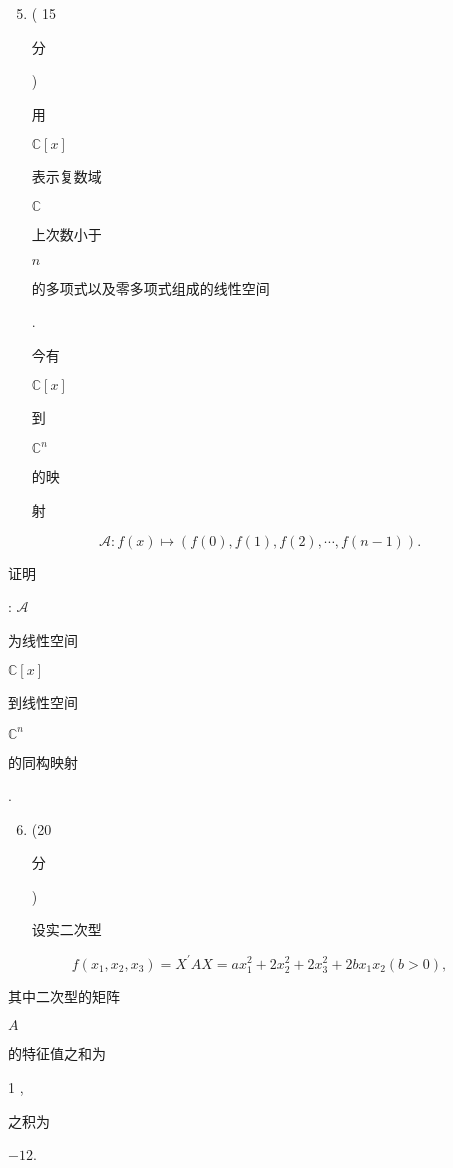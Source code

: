 \documentclass[10pt]{article}
\begin{document}
\begin{enumerate}
  \setcounter{enumi}{4}
  \item ( 15 \begin{CJK}{UTF8}{mj}分\end{CJK}) \begin{CJK}{UTF8}{mj}用\end{CJK} $\mathbb{C}[x]$ \begin{CJK}{UTF8}{mj}表示复数域\end{CJK} $\mathbb{C}$ \begin{CJK}{UTF8}{mj}上次数小于\end{CJK} $n$ \begin{CJK}{UTF8}{mj}的多项式以及零多项式组成的线性空间\end{CJK}. \begin{CJK}{UTF8}{mj}今有\end{CJK} $\mathbb{C}[x]$ \begin{CJK}{UTF8}{mj}到\end{CJK} $\mathbb{C}^{n}$ \begin{CJK}{UTF8}{mj}的映\end{CJK} \begin{CJK}{UTF8}{mj}射\end{CJK}
\end{enumerate}
$$
\mathscr{A}: f(x) \mapsto(f(0), f(1), f(2), \cdots, f(n-1)) .
$$
\begin{CJK}{UTF8}{mj}证明\end{CJK}: $\mathscr{A}$ \begin{CJK}{UTF8}{mj}为线性空间\end{CJK} $\mathbb{C}[x]$ \begin{CJK}{UTF8}{mj}到线性空间\end{CJK} $\mathbb{C}^{n}$ \begin{CJK}{UTF8}{mj}的同构映射\end{CJK}.

\begin{enumerate}
  \setcounter{enumi}{5}
  \item (20 \begin{CJK}{UTF8}{mj}分\end{CJK}) \begin{CJK}{UTF8}{mj}设实二次型\end{CJK}
\end{enumerate}
$$
f\left(x_{1}, x_{2}, x_{3}\right)=X^{\prime} A X=a x_{1}^{2}+2 x_{2}^{2}+2 x_{3}^{2}+2 b x_{1} x_{2}(b>0),
$$
\begin{CJK}{UTF8}{mj}其中二次型的矩阵\end{CJK} $A$ \begin{CJK}{UTF8}{mj}的特征值之和为\end{CJK} 1 , \begin{CJK}{UTF8}{mj}之积为\end{CJK} $-12$.
\end{document}

